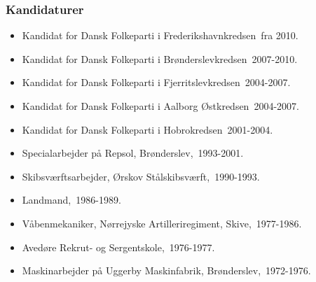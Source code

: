 \documentclass[11pt, a4paper]{awesome-cv}
\begin{document}
\begin{cvletter}
\subsubsection*{Kandidaturer}
\begin{itemize}
\item Kandidat for Dansk Folkeparti i Frederikshavnkredsen fra 2010.
\item Kandidat for Dansk Folkeparti i Brønderslevkredsen 2007-2010.
\item Kandidat for Dansk Folkeparti i Fjerritslevkredsen 2004-2007.
\item Kandidat for Dansk Folkeparti i Aalborg Østkredsen 2004-2007.
\item Kandidat for Dansk Folkeparti i Hobrokredsen 2001-2004.
\end{itemize}
\begin{itemize}
\item Specialarbejder på Repsol, Brønderslev, 1993-2001.
\item Skibsværftsarbejder, Ørskov Stålskibsværft, 1990-1993.
\item Landmand, 1986-1989.
\item Våbenmekaniker, Nørrejyske Artilleriregiment, Skive, 1977-1986.
\item Avedøre Rekrut- og Sergentskole, 1976-1977.
\item Maskinarbejder på Uggerby Maskinfabrik, Brønderslev, 1972-1976.
\end{itemize}
\end{cvletter}
\end{document}
